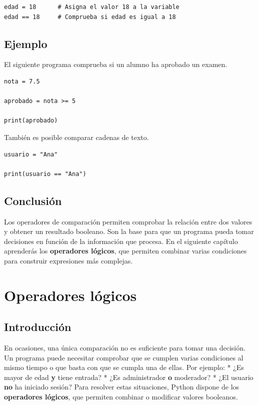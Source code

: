 \documentclass[11pt,a5paper,twoside]{book}
\begin{document}
\begin{tcolorbox}
\scriptsize
 \begin{verbatim}
edad = 18      # Asigna el valor 18 a la variable
edad == 18     # Comprueba si edad es igual a 18
\end{verbatim}
\end{tcolorbox}
\subsection{Ejemplo}
El siguiente programa comprueba si un alumno ha aprobado un examen.


\begin{tcolorbox}
\scriptsize
 \begin{verbatim}
nota = 7.5

aprobado = nota >= 5

print(aprobado)
\end{verbatim}
\end{tcolorbox}
También es posible comparar cadenas de texto.


\begin{tcolorbox}
\scriptsize
 \begin{verbatim}
usuario = "Ana"

print(usuario == "Ana")
\end{verbatim}
\end{tcolorbox}
\subsection{Conclusión}
Los operadores de comparación permiten comprobar la relación entre dos valores y obtener un resultado booleano. Son la base para que un programa pueda tomar decisiones en función de la información que procesa.
En el siguiente capítulo aprenderás los \textbf{operadores lógicos}, que permiten combinar varias condiciones para construir expresiones más complejas.

\newpage

\section{Operadores lógicos}
\subsection{Introducción}
En ocasiones, una única comparación no es suficiente para tomar una decisión. Un programa puede necesitar comprobar que se cumplen varias condiciones al mismo tiempo o que basta con que se cumpla una de ellas.
Por ejemplo:
* ¿Es mayor de edad \textbf{y} tiene entrada?
* ¿Es administrador \textbf{o} moderador?
* ¿El usuario \textbf{no} ha iniciado sesión?
Para resolver estas situaciones, Python dispone de los \textbf{operadores lógicos}, que permiten combinar o modificar valores booleanos.
\end{document}
